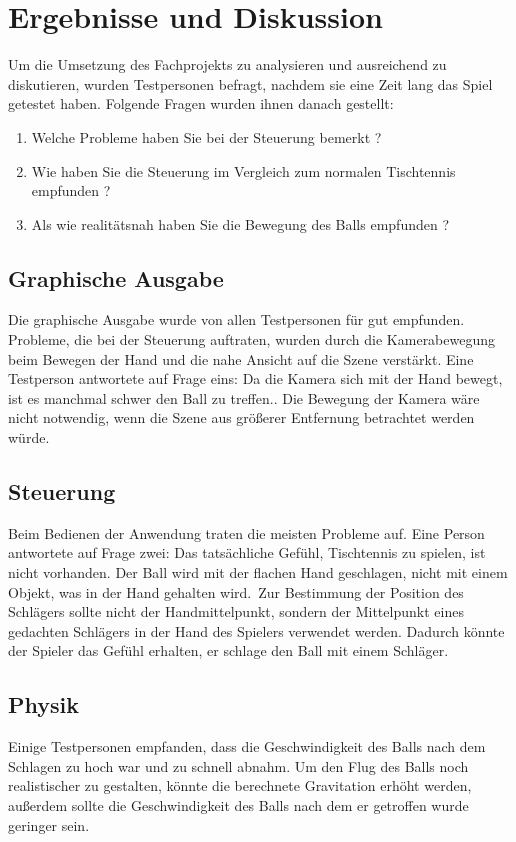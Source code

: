 
\chapter{Ergebnisse und Diskussion}
\label{Kapitel 5}
%
Um die Umsetzung des Fachprojekts zu analysieren und ausreichend zu diskutieren, wurden Testpersonen befragt, nachdem sie eine Zeit lang das Spiel getestet haben. Folgende Fragen wurden ihnen danach gestellt:
\begin{enumerate}
	\item \glqq Welche Probleme haben Sie bei der Steuerung bemerkt ?\grqq
	\item \glqq Wie haben Sie die Steuerung im Vergleich zum normalen Tischtennis empfunden ?\grqq
	\item \glqq Als wie realitätsnah haben Sie die Bewegung des Balls empfunden ?\grqq
	
\end{enumerate}

\section{Graphische Ausgabe}
\label{Kapitel_5_-_Unterkapitel_1}
Die graphische Ausgabe wurde von allen Testpersonen für gut empfunden. Probleme, die bei der Steuerung auftraten,  wurden durch die Kamerabewegung beim Bewegen der Hand und die nahe Ansicht auf die Szene verstärkt. Eine Testperson antwortete auf Frage eins: \glqq Da die Kamera sich mit der Hand bewegt, ist es manchmal schwer den Ball zu treffen.\grqq. Die Bewegung der Kamera wäre nicht notwendig, wenn die Szene aus größerer Entfernung betrachtet werden würde.
\section{Steuerung}
\label{Kapitel_5_-_Unterkapitel_2}
Beim Bedienen der Anwendung traten  die meisten Probleme auf. Eine Person antwortete auf Frage zwei: \glqq Das tatsächliche Gefühl, Tischtennis zu spielen, ist nicht vorhanden. Der Ball wird mit der flachen Hand geschlagen, nicht mit einem Objekt, was in der Hand gehalten wird.\grqq \ Zur Bestimmung der Position des Schlägers sollte nicht der Handmittelpunkt, sondern der Mittelpunkt eines gedachten Schlägers in der Hand des Spielers verwendet werden. Dadurch könnte der Spieler das Gefühl erhalten, er schlage den Ball mit einem Schläger.
\section{Physik}
\label{Kapitel_5_-_Unterkapitel_3}
Einige Testpersonen empfanden, dass die Geschwindigkeit des Balls nach dem Schlagen zu hoch war und zu schnell abnahm. Um den Flug des Balls noch realistischer zu gestalten, könnte die berechnete Gravitation erhöht werden, außerdem sollte die Geschwindigkeit des Balls nach dem er getroffen wurde geringer sein.